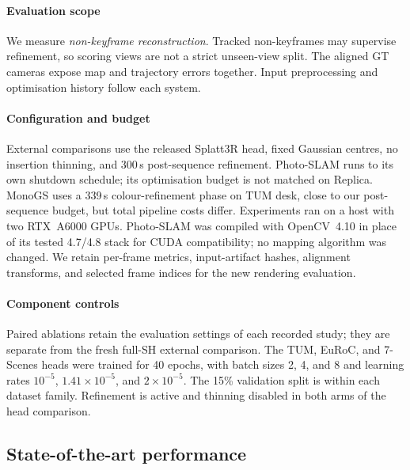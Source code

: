 \paragraph{Evaluation scope}
We measure \emph{non-keyframe reconstruction}. Tracked non-keyframes may
supervise refinement, so scoring views are not a strict unseen-view split.
The aligned GT cameras expose map and trajectory errors together.
Input preprocessing and optimisation history follow each system.

\paragraph{Configuration and budget}
External comparisons use the released Splatt3R head, fixed Gaussian centres,
no insertion thinning, and 300\,s post-sequence refinement.
Photo-SLAM runs to its own shutdown schedule; its optimisation budget is not
matched on Replica. MonoGS uses a 339\,s colour-refinement phase on TUM desk,
close to our post-sequence budget, but total pipeline costs differ.
Experiments ran on a host with two RTX~A6000 GPUs.
Photo-SLAM was compiled with OpenCV~4.10 in place of its tested 4.7/4.8 stack
for CUDA compatibility; no mapping algorithm was changed.
We retain per-frame metrics, input-artifact hashes, alignment transforms, and
selected frame indices for the new rendering evaluation.

\paragraph{Component controls}
Paired ablations retain the evaluation settings of each recorded study;
they are separate from the fresh full-SH external comparison.
The TUM, EuRoC, and 7-Scenes heads were trained for 40 epochs,
with batch sizes 2, 4, and 8 and learning rates $10^{-5}$,
$1.41{\times}10^{-5}$, and $2{\times}10^{-5}$. The 15\% validation split
is within each dataset family. Refinement is active and thinning disabled
in both arms of the head comparison.

\subsection{State-of-the-art performance}
\begin{table}[t]
  \centering
  \caption{Replica reconstruction, monocular input, full exported SH.
  Bold marks the better value within each scene and metric.}
  \label{tab:replica}
  \small\setlength{\tabcolsep}{4pt}
  
\end{table}

